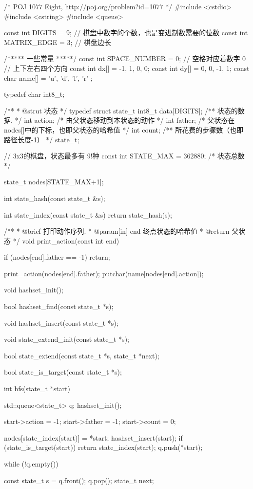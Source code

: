 \begin{Codex}[label=eight_digits_bfs.c]
/* POJ 1077 Eight, http://poj.org/problem?id=1077 */
#include <cstdio>
#include <cstring>
#include <queue>

const int DIGITS = 9; // 棋盘中数字的个数，也是变进制数需要的位数
const int MATRIX_EDGE = 3;       // 棋盘边长

/***** 一些常量 *****/
const int SPACE_NUMBER = 0; // 空格对应着数字 0
// 上下左右四个方向
const int dx[] = {-1, 1, 0, 0};
const int dy[] = {0, 0, -1, 1};
const char name[] = { 'u', 'd', 'l', 'r' };

typedef char int8_t;

/**
 * @strut 状态
 */
typedef struct state_t {
    int8_t data[DIGITS];  /** 状态的数据. */
    int action; /* 由父状态移动到本状态的动作 */
    int father; /* 父状态在nodes[]中的下标，也即父状态的哈希值 */
    int count;  /** 所花费的步骤数（也即路径长度-1） */
} state_t;

// 3x3的棋盘，状态最多有 9!种
const int STATE_MAX = 362880;  /* 状态总数 */

state_t nodes[STATE_MAX+1];

int state_hash(const state_t &s);

int state_index(const state_t &s) {
    return state_hash(s);
}

/**
 * @brief 打印动作序列.
 * @param[in] end 终点状态的哈希值
 * @return 父状态
 */
void print_action(const int end) {
    if (nodes[end].father == -1) return;

    print_action(nodes[end].father);
    putchar(name[nodes[end].action]);
}

void hashset_init();

bool hashset_find(const state_t *s);

void hashset_insert(const state_t *s);

void state_extend_init(const state_t *s);

bool state_extend(const state_t *s, state_t *next);

bool state_is_target(const state_t *s);


int bfs(state_t *start) {
    std::queue<state_t> q;
    hashset_init();

    start->action = -1;
    start->father = -1;
    start->count = 0;

    nodes[state_index(start)] = *start;
    hashset_insert(start);
    if (state_is_target(start))
        return state_index(start);
    q.push(*start);

    while (!q.empty()) {
        const state_t s = q.front(); q.pop();
        state_t next;

}}
\end{Codex}
